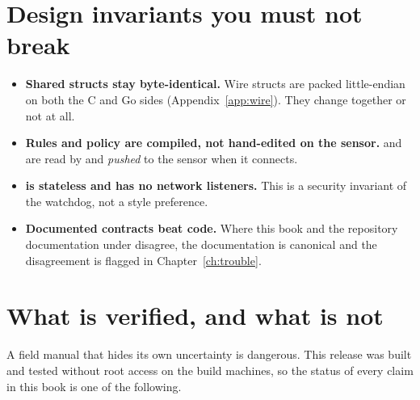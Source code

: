 \section{Design invariants you must not break}
\begin{itemize}
\item \textbf{Shared structs stay byte-identical.} Wire structs are packed little-endian on both the C and Go sides (Appendix~\ref{app:wire}). They change together or not at all.
\item \textbf{Rules and policy are compiled, not hand-edited on the sensor.}  and  are read by  and \emph{pushed} to the sensor when it connects.
\item \textbf{ is stateless and has no network listeners.} This is a security invariant of the watchdog, not a style preference.
\item \textbf{Documented contracts beat code.} Where this book and the repository documentation under  disagree, the documentation is canonical and the disagreement is flagged in Chapter~\ref{ch:trouble}.
\end{itemize}

\section{What is verified, and what is not}
A field manual that hides its own uncertainty is dangerous. This release was built and tested without
root access on the build machines, so the status of every claim in this book is one of the following.

